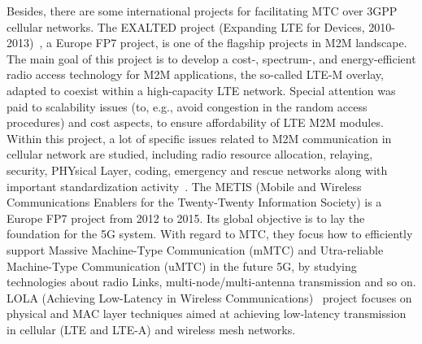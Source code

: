 Besides, there are some international projects for facilitating MTC over 3GPP cellular networks. The EXALTED project (Expanding LTE for Devices, 2010-2013)~\cite{EXALTED}, a Europe FP7 project, is one of the flagship projects in M2M landscape. The main goal of this project is to develop a cost-, spectrum-, and energy-efficient radio access technology for M2M applications, the so-called LTE-M overlay, adapted to coexist within a high-capacity LTE network. Special attention was paid to scalability issues (to, e.g., avoid congestion in the random access procedures) and cost aspects, to ensure affordability of LTE M2M modules. 
Within this project, a lot of specific issues related to M2M communication in cellular network are studied, including radio resource allocation, relaying, security, PHYsical Layer, coding, emergency and rescue networks along with important standardization activity~\cite{bartoli2011low}\cite{GotsisLA12}. 
The METIS (Mobile and Wireless Communications Enablers for the Twenty-Twenty Information Society) is a Europe FP7 project from 2012 to 2015. Its global objective is to lay the foundation for the 5G system. With regard to MTC, they focus how to efficiently support Massive Machine-Type Communication (mMTC) and Utra-reliable Machine-Type Communication (uMTC) in the future 5G, by studying technologies about radio Links, multi-node/multi-antenna transmission and so on.
LOLA (Achieving Low-Latency in Wireless Communications)~\cite{lola} project focuses on physical and MAC layer techniques aimed at achieving low-latency transmission in cellular (LTE and LTE-A) and wireless mesh networks.